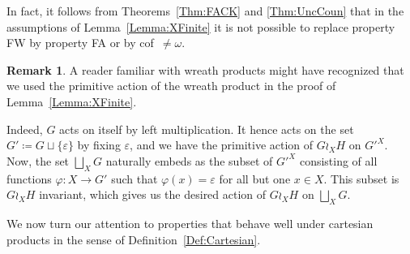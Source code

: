 \documentclass[a4paper]{article}
\theoremstyle{definition}
\newtheorem{rem}[lem]{Remark}
\begin{document}
In fact, it follows from Theorems~\ref{Thm:FACK} and \ref{Thm:UncCoun} that in the assumptions of Lemma~\ref{Lemma:XFinite} it is not possible to replace property FW by property FA or by cof~$\neq\omega$.
%
%
\begin{rem}\label{Rem:Actionsb}
A reader familiar with wreath products might have recognized that we used the primitive action of the wreath product in the proof of Lemma~\ref{Lemma:XFinite}.

Indeed, $G$ acts on itself by left multiplication.
It hence acts on the set $G'\coloneqq G\sqcup\{\varepsilon\}$ by fixing $\varepsilon$, and we have the primitive action of $G\wr_{X} H$ on $G'^X$.
Now, the set $\bigsqcup_XG$ naturally embeds as the subset of $G'^X$ consisting of all functions $\varphi\colon X\to G'$ such that $\varphi(x)=\varepsilon$ for all but one $x\in X$.
This subset is $G\wr_{X} H$ invariant, which gives us the desired action of $G\wr_{X} H$ on $\bigsqcup_XG$.
\end{rem}
%
%
We now turn our attention to properties that behave well under cartesian products in the sense of Definition~\ref{Def:Cartesian}.
\end{document}
